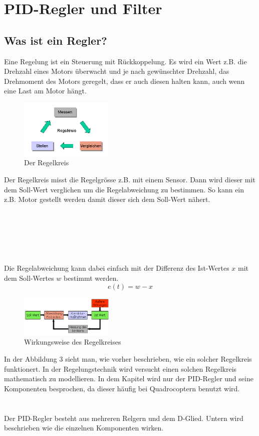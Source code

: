 \documentclass[12pt,a4paper, ngerman]{article}
\begin{document}
\section{PID-Regler und Filter}
\subsection{Was ist ein Regler?}
Eine Regelung ist ein Steuerung mit Rückkoppelung. Es wird ein Wert z.B. die Drehzahl eines Motors überwacht und je nach gewünschter Drehzahl, das Drehmoment des Motors geregelt, dass er auch diesen halten kann, auch wenn eine Last am Motor hängt.\cite{website:rn-wissen_Regelungstechnik}\\
\begin{figure}
\centering
\includegraphics[width=0.4\textwidth]{Regelkreis1.png}
\caption[https://rn-wissen.de/wiki/images/2/25/Regelkreis1.png]{Der Regelkreis}
\end{figure}
Der Regelkreis misst die Regelgrösse z.B. mit einem Sensor. Dann wird dieser mit dem Soll-Wert verglichen um die Regelabweichung zu bestimmen. So kann ein z.B. Motor gestellt werden damit dieser sich dem Soll-Wert nähert.\\ \\ \\ \\ \\ \\ \\
Die Regelabweichung kann dabei einfach mit der Differenz des Ist-Wertes $x$ mit dem Soll-Wertes $w$ bestimmt werden.
\begin{equation}
e(t)=w-x
\end{equation}
\begin{figure}
\centering
\includegraphics[width=0.4\textwidth]{Regelkreis2.png}
\caption[https://rn-wissen.de/wiki/images/5/5d/Regelkreis2.png]{Wirkungsweise des Regelkreises}
\end{figure}
In der Abbildung 3 sieht man, wie vorher beschrieben, wie ein solcher Regelkreis funktionert. In der Regelungstechnik wird versucht einen solchen Regelkreis mathematisch zu modellieren. In dem Kapitel wird nur der PID-Regler und seine Komponenten besprochen, da dieser häufig bei Quadrocoptern benutzt wird.
\\ \\ \\
Der PID-Regler besteht aus mehreren Relgern und dem D-Glied. Untern wird beschrieben wie die einzelnen Komponenten wirken. 
\end{document}
